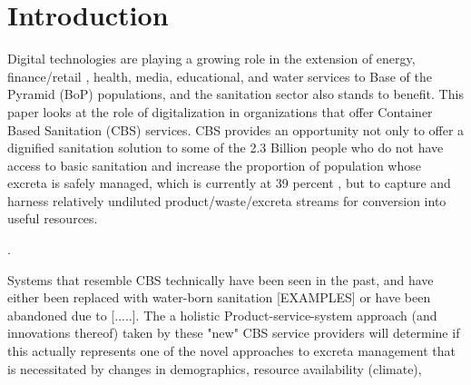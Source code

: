 \documentclass[sustainability,article,submit,moreauthors,pdftex,10pt,a4paper]{mdpi}
\theoremstyle{mdpi}
\newcounter{ex}
\newcounter{re}
\theoremstyle{mdpidefinition}
\begin{document}




\section{Introduction}



Digital technologies are playing a growing role in the extension of energy, finance/retail \cite{Berger2013}, health, media, educational, and water \cite{Gebauer2014} services to Base of the Pyramid (BoP) populations, and the sanitation sector also stands to benefit. This paper looks at the role of digitalization in organizations that offer Container Based Sanitation (CBS) services. CBS provides an opportunity not only to offer a dignified sanitation solution to some of the 2.3 Billion people who do not have access to basic sanitation and increase the proportion of population whose excreta is safely managed, which is currently at 39 percent \cite{WHO2017}, but to capture and harness relatively undiluted product/waste/excreta streams for conversion into  useful resources. 

.

Systems that resemble CBS technically have been seen in the past, and have either been replaced with water-born sanitation [EXAMPLES] or have been abandoned due to [.....]. The a holistic Product-service-system approach (and innovations thereof) taken by these "new" CBS service providers will determine if this actually represents one of the novel approaches to excreta management that is necessitated by changes in demographics, resource availability (climate), 
\end{document}
